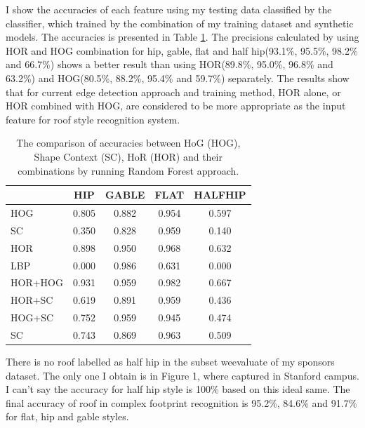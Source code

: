 \documentclass{iitthesis}
\begin{document}
I show the accuracies of each feature using my testing data classified by the classifier, which trained by the combination of my training
dataset and synthetic models. The accuracies is presented in Table \ref{table: ac}. The precisions calculated by using HOR and HOG combination for hip, gable, flat and half hip(93.1\%, 95.5\%, 98.2\% and 66.7\%) shows a better result than using HOR(89.8\%, 95.0\%, 96.8\% and 63.2\%) and HOG(80.5\%, 88.2\%, 95.4\% and 59.7\%) separately. The results show that for current edge detection approach and training method, HOR alone, or HOR combined with HOG, are considered to be more appropriate as the input feature for roof style recognition system.

\begin{table}[t]
\caption{The comparison of accuracies between HoG (HOG), Shape Context (SC), HoR (HOR) and their combinations by running Random Forest  approach.}
	\centering
	\scalebox{1.0}
	{
		\begin{tabular}{lcccc}
			\hline \hline
			
			&HIP & GABLE & FLAT & HALFHIP\\
			\hline
			
			HOG & 0.805 & 0.882 & 0.954 & 0.597 \\
			
			SC & 0.350 & 0.828 & 0.959 & 0.140 \\
			
			HOR & 0.898 & 0.950 & 0.968 & 0.632 \\
			
			LBP & 0.000 & 0.986 & 0.631 & 0.000 \\
			
			HOR+HOG & 0.931 & 0.959 & 0.982 & 0.667 \\
			
			HOR+SC & 0.619 & 0.891 & 0.959 & 0.436 \\
			
			HOG+SC & 0.752 & 0.959 & 0.945 & 0.474 \\
			
			SC & 0.743 & 0.869 & 0.963 & 0.509 \\
			\hline
		\end{tabular}
	}
	\label{table: ac}
\end{table}

There is no roof labelled as half hip in the subset weevaluate of my sponsors dataset. The only one I obtain is in Figure 1, where captured in Stanford campus. I can’t say the accuracy for half hip style is 100\% based on this ideal same. The final accuracy of roof in complex footprint recognition is 95.2\%, 84.6\% and 91.7\% for flat, hip and gable styles.
\end{document}

